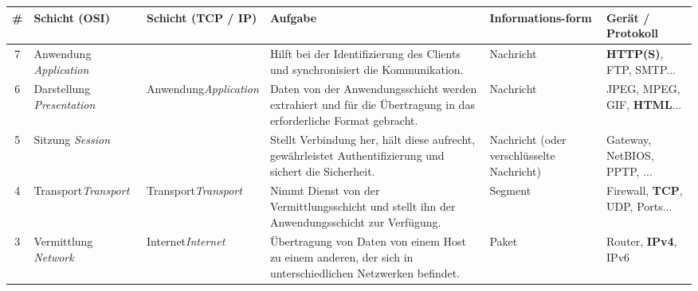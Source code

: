\begin{table}[H]
\centering

\begin{tabular}{c|m{2.6cm}||m{2cm}||m{4.6cm}|m{2.5cm}|m{2cm}}
\textbf{\#} & \textbf{Schicht (OSI)}& \textbf{Schicht \newline (TCP / IP)} & \textbf{Aufgabe}                                                                                & \textbf{Informations-\newline form} & \textbf{Gerät / \newline Protokoll}               \\ \midrule\midrule
\rowcolor{yellow!10}7                    & Anwendung \newline \textit{Application}              && Hilft bei der Identifizierung des Clients und synchronisiert die Kommunikation.                            & Nachricht                               & \textbf{HTTP(S)}, FTP, SMTP...                                        \\
\rowcolor{yellow!20}6                    & Darstellung \newline \textit{Presentation}   &Anwendung\newline\textit{Application}& Daten von der Anwendungsschicht werden extrahiert und für die Übertragung in das erforderliche Format gebracht. & Nachricht                               & JPEG, MPEG, GIF, \textbf{HTML}...                            \\ 
\rowcolor{yellow!30}5                    & Sitzung \newline \textit{Session} && Stellt Verbindung her, hält diese aufrecht, gewährleistet Authentifizierung und sichert die Sicherheit.   & Nachricht (oder verschlüsselte Nachricht) & Gateway, NetBIOS, PPTP, ... \\ 
\rowcolor{orange!20}4                    & Transport\newline \textit{Transport} &Transport\newline\textit{Transport}& Nimmt Dienst von der Vermittlungsschicht und stellt ihn der Anwendungsschicht zur Verfügung.                  & Segment                                 & Firewall, \textbf{TCP}, UDP, Ports... \\ 
\rowcolor{RoyalBlue!20}3                    & Vermittlung \newline \textit{Network} &Internet\newline\textit{Internet}& Übertragung von Daten von einem Host zu einem anderen, der sich in unterschiedlichen Netzwerken befindet. & Paket                                   & Router, \textbf{IPv4}, IPv6                                     \\ 

\end{tabular}
\end{table}
